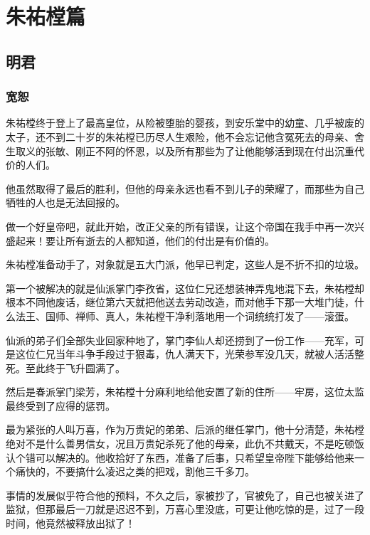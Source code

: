 \chapter*{朱祐樘篇}
\section{明君}
\ifnum{}
	\begin{multicols}{\theparacolNo}
		\fi
		\subsection{宽恕}
		朱祐樘终于登上了最高皇位，从险被堕胎的婴孩，到安乐堂中的幼童、几乎被废的太子，还不到二十岁的朱祐樘已历尽人生艰险，他不会忘记他含冤死去的母亲、舍生取义的张敏、刚正不阿的怀恩，以及所有那些为了让他能够活到现在付出沉重代价的人们。

		他虽然取得了最后的胜利，但他的母亲永远也看不到儿子的荣耀了，而那些为自己牺牲的人也是无法回报的。

		做一个好皇帝吧，就此开始，改正父亲的所有错误，让这个帝国在我手中再一次兴盛起来！要让所有逝去的人都知道，他们的付出是有价值的。

		朱祐樘准备动手了，对象就是五大门派，他早已判定，这些人是不折不扣的垃圾。

		第一个被解决的就是仙派掌门李孜省，这位仁兄还想装神弄鬼地混下去，朱祐樘却根本不同他废话，继位第六天就把他送去劳动改造，而对他手下那一大堆门徒，什么法王、国师、禅师、真人，朱祐樘干净利落地用一个词统统打发了——滚蛋。

		仙派的弟子们全部失业回家种地了，掌门李仙人却还捞到了一份工作——充军，可是这位仁兄当年斗争手段过于狠毒，仇人满天下，光荣参军没几天，就被人活活整死。至此终于飞升圆满了。

		然后是春派掌门梁芳，朱祐樘十分麻利地给他安置了新的住所——牢房，这位太监最终受到了应得的惩罚。

		最为紧张的人叫万喜，作为万贵妃的弟弟、后派的继任掌门，他十分清楚，朱祐樘绝对不是什么善男信女，况且万贵妃杀死了他的母亲，此仇不共戴天，不是吃顿饭认个错可以解决的。他收拾好了东西，准备了后事，只希望皇帝陛下能够给他来一个痛快的，不要搞什么凌迟之类的把戏，割他三千多刀。

		事情的发展似乎符合他的预料，不久之后，家被抄了，官被免了，自己也被关进了监狱，但那最后一刀就是迟迟不到，万喜心里没底，可更让他吃惊的是，过了一段时间，他竟然被释放出狱了！


\end{multicols}
